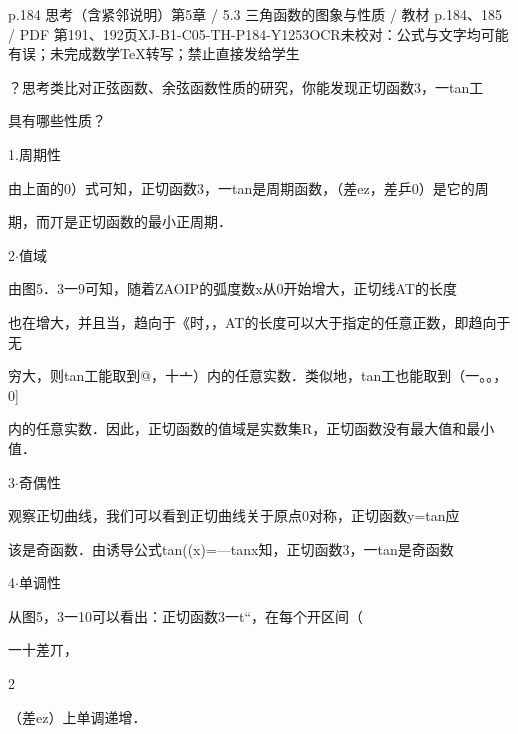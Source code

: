 \begin{bankitem}{p.184 思考（含紧邻说明）}{第5章 / 5.3 三角函数的图象与性质 / 教材 p.184、185 / PDF 第191、192页}{XJ-B1-C05-TH-P184-Y1253}{OCR未校对：公式与文字均可能有误；未完成数学TeX转写；禁止直接发给学生}
\begin{ocrdraft}
\par
？思考类比对正弦函数、余弦函数性质的研究，你能发现正切函数3，一tan工
\par
具有哪些性质？
\par
1.周期性
\par
由上面的0）式可知，正切函数3，一tan是周期函数，（差ez，差乒0）是它的周
\par
期，而丌是正切函数的最小正周期．
\par
2\ensuremath{\cdot}值域
\par
由图5．3一9可知，随着ZAOIP的弧度数x从0开始增大，正切线AT的长度
\par
也在增大，并且当，趋向于《时，，AT的长度可以大于指定的任意正数，即趋向于无
\par
[教材p.185 / PDF第192页]
\par
穷大，则tan工能取到@，十亠）内的任意实数．类似地，tan工也能取到（一。。，0]
\par
内的任意实数．因此，正切函数的值域是实数集R，正切函数没有最大值和最小值．
\par
3\ensuremath{\cdot}奇偶性
\par
观察正切曲线，我们可以看到正切曲线关于原点0对称，正切函数y=tan应
\par
该是奇函数．由诱导公式tan((x)=—tanx知，正切函数3，一tan是奇函数
\par
4\ensuremath{\cdot}单调性
\par
从图5，3一10可以看出：正切函数3一t“，在每个开区间（
\par
一十差丌，
\par
2
\par
（差ez）上单调递增．
\end{ocrdraft}
\end{bankitem}
